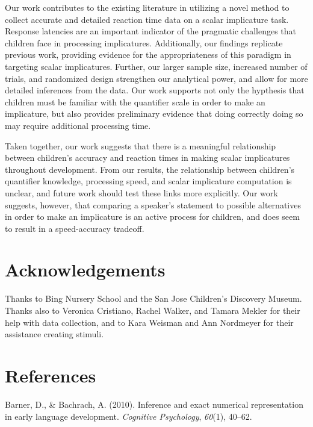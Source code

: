 \documentclass[10pt, letterpaper]{article}
\begin{document}
Our work contributes to the existing literature in utilizing a novel
method to collect accurate and detailed reaction time data on a scalar
implicature task. Response latencies are an important indicator of the
pragmatic challenges that children face in processing implicatures.
Additionally, our findings replicate previous work, providing evidence
for the appropriateness of this paradigm in targeting scalar
implicatures. Further, our larger sample size, increased number of
trials, and randomized design strengthen our analytical power, and allow
for more detailed inferences from the data. Our work supports not only
the hypthesis that children must be familiar with the quantifier scale
in order to make an implicature, but also provides preliminary evidence
that doing correctly doing so may require additional processing time.

Taken together, our work suggests that there is a meaningful
relationship between children's accuracy and reaction times in making
scalar implicatures throughout development. From our results, the
relationship between children's quantifier knowledge, processing speed,
and scalar implicature computation is unclear, and future work should
test these links more explicitly. Our work suggests, however, that
comparing a speaker's statement to possible alternatives in order to
make an implicature is an active process for children, and does seem to
result in a speed-accuracy tradeoff.

\section{Acknowledgements}\label{acknowledgements}

Thanks to Bing Nursery School and the San Jose Children's Discovery
Museum. Thanks also to Veronica Cristiano, Rachel Walker, and Tamara
Mekler for their help with data collection, and to Kara Weisman and Ann
Nordmeyer for their assistance creating stimuli.

\section{References}\label{references}

\setlength{\parindent}{-0.1in} \setlength{\leftskip}{0.125in} \noindent

Barner, D., \& Bachrach, A. (2010). Inference and exact numerical
representation in early language development. \emph{Cognitive
Psychology}, \emph{60}(1), 40--62.
\end{document}

